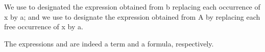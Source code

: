\begin{convention}
	We use  to designated the expression obtained from \synt b
	replacing each occurrence of \synt x by \synt a; and we use 
	to designate the expression obtained from \synt A by replacing each free occurrence of \synt x
	by \synt a.
\end{convention}

\begin{fact}
	The expressions  and 
	are indeed a term and a formula, respectively.
\end{fact}

